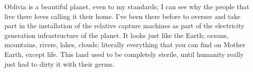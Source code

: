 \documentclass{book}
\newcommand{\timeskip}{\begin{center}\musSegno{}\end{center}}
\begin{document}
			Oblivia is a beautiful planet, even to my standards; I can see why the people that live
			there loves calling it their home. I've been there before to oversee and take part in the
			installation of the relative capture machines as part of the electricity generation
			infrastructure of the planet. It looks just like the Earth; oceans, mountains, rivers,
			lakes, clouds; literally everything that you can find on Mother Earth, except life. This
			land used to be completely sterile, until humanity really just had to dirty it with their
			germs.

			\timeskip{}
\end{document}
